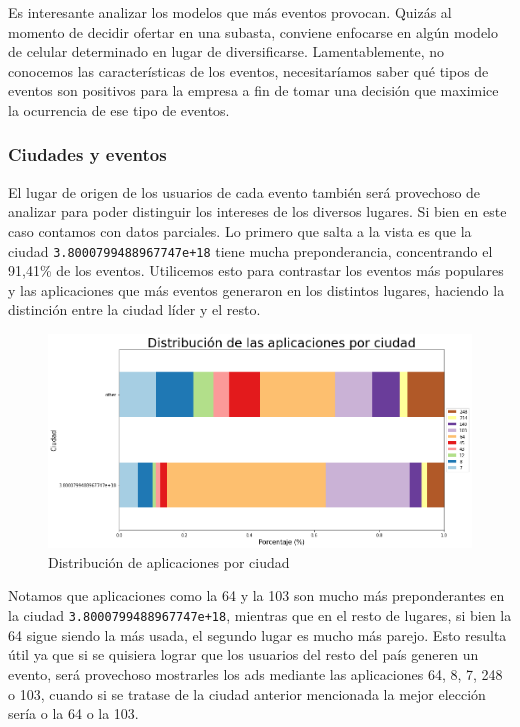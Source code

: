 \documentclass[a4paper, 12pt]{article}
\begin{document}
    Es interesante analizar los modelos que más eventos provocan. Quizás al momento de decidir ofertar
    en una subasta, conviene enfocarse en algún modelo de celular determinado en lugar de diversificarse. Lamentablemente,
    no conocemos las características de los eventos, necesitaríamos saber qué tipos de eventos son positivos para la empresa a fin
    de tomar una decisión que maximice la ocurrencia de ese tipo de eventos.

	\subsubsection{Ciudades y eventos}
		El lugar de origen de los usuarios de cada evento también será provechoso de analizar para poder distinguir los intereses de los diversos lugares. Si bien en este caso contamos con datos parciales. Lo primero que salta a la vista es que la ciudad \texttt{3.8000799488967747e+18} tiene mucha preponderancia, concentrando el 91,41\% de los eventos. Utilicemos esto para contrastar los eventos más populares y las aplicaciones que más eventos generaron en los distintos lugares, haciendo la distinción entre la ciudad líder y el resto.

		\FloatBarrier
		\begin{figure}[h]
			\centering
			\includegraphics[width=\textwidth]{images/events/citiapp.png}
			\caption{Distribución de aplicaciones por ciudad}
		\end{figure}
		\FloatBarrier

		Notamos que aplicaciones como la 64 y la 103 son mucho más preponderantes en la ciudad \texttt{3.8000799488967747e+18},
		mientras que en el resto de lugares, si bien la 64 sigue siendo la más usada, el segundo lugar es mucho más parejo. Esto resulta útil ya que si se quisiera lograr que los usuarios del resto del país generen un evento, será provechoso mostrarles los ads mediante las aplicaciones 64, 8, 7, 248 o 103, cuando si se tratase de la ciudad anterior mencionada la mejor elección sería o la 64 o la 103.
		
\end{document}
